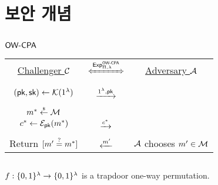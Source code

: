 \documentclass{article}
\begin{document}
\newpage
\section{보안 개념}

\subsection{$\textsf{OW-CPA}$}

\begin{tcolorbox}[colback=white]
	\centering
	\begin{tabularx}{\linewidth}{CcC}
		\underline{Challenger $\mathcal{C}$} & 
		$\xLeftrightarrow{\Exp^{\owcpa}_{\sch, \sp}}$ & 
		\underline{Adversary $\mathcal{A}$} \\

		 \\

		$(\textsf{pk}, \textsf{sk}) \gets \mathcal{K}(1^{\lambda})$ & 
		$\xrightarrow{1^{\lambda}, \textsf{pk}}$ & 
	   \\

		 \\

		$m^* \overset{{\scriptscriptstyle\$}}{\leftarrow} \mathcal{M}$ \\
		$c^* \gets \mathcal{E}_{\textsf{pk}}(m^*)$ &
		$\xrightarrow{c^*}$ &
		 \\

		 \\

		Return $[m' \overset{?}{=} m^*]$ & 
		$\xleftarrow{m'}$ & 
		$\mathcal{A}$ chooses $m' \in \mathcal{M}$ \\
  \end{tabularx}
\end{tcolorbox}


\subsection{\owf}

$f:\{0, 1\}^{\lambda} \to \{0, 1\}^{\lambda}$ is a trapdoor one-way permutation.
\end{document}
